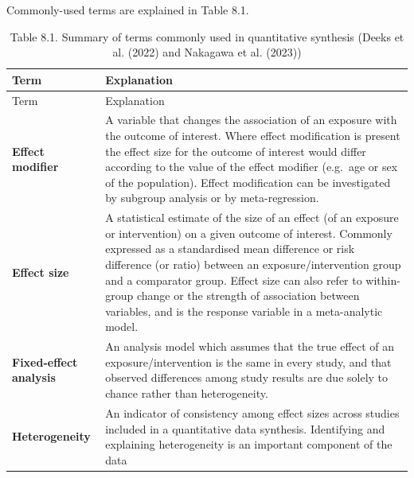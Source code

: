 \documentclass[
  letterpaper,
  DIV=11,
  numbers=noendperiod]{scrreprt}
\begin{document}
Commonly-used terms are explained in Table 8.1.

\begin{longtable}[]{@{}
  >{\raggedright\arraybackslash}p{}
  >{\raggedright\arraybackslash}p{}@{}}
\caption{Table 8.1. Summary of terms commonly used in quantitative
synthesis (Deeks et al. (2022) and {Nakagawa et al.}
(2023))}\tabularnewline
\toprule\noalign{}
\begin{minipage}[b]{\linewidth}\raggedright
Term
\end{minipage} & \begin{minipage}[b]{\linewidth}\raggedright
Explanation
\end{minipage} \\
\midrule\noalign{}
\endfirsthead
\toprule\noalign{}
\begin{minipage}[b]{\linewidth}\raggedright
Term
\end{minipage} & \begin{minipage}[b]{\linewidth}\raggedright
Explanation
\end{minipage} \\
\midrule\noalign{}
\endhead
\bottomrule\noalign{}
\endlastfoot
\textbf{Effect modifier} & A variable that changes the association of an
exposure with the outcome of interest. Where effect modification is
present the effect size for the outcome of interest would differ
according to the value of the effect modifier (e.g.~age or sex of the
population). Effect modification can be investigated by subgroup
analysis or by meta-regression. \\
\textbf{Effect size} & A statistical estimate of the size of an effect
(of an exposure or intervention) on a given outcome of interest.
Commonly expressed as a standardised mean difference or risk difference
(or ratio) between an exposure/intervention group and a comparator
group. Effect size can also refer to within-group change or the strength
of association between variables, and is the response variable in a
meta-analytic model. \\
\textbf{Fixed-effect analysis} & An analysis model which assumes that
the true effect of an exposure/intervention is the same in every study,
and that observed differences among study results are due solely to
chance rather than heterogeneity. \\
\textbf{Heterogeneity} & An indicator of consistency among effect sizes
across studies included in a quantitative data synthesis. Identifying
and explaining heterogeneity is an important component of the data

\end{longtable}
\end{document}
